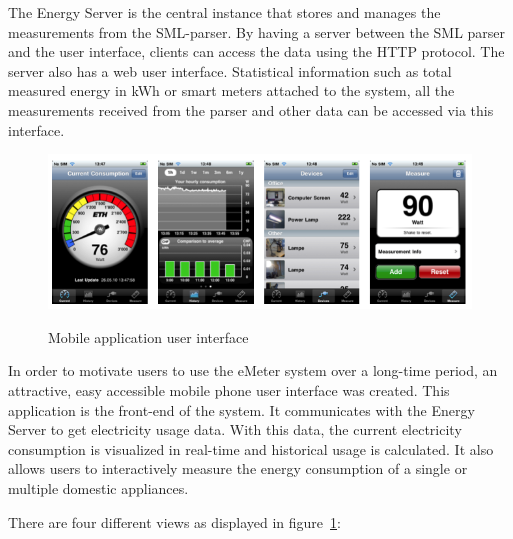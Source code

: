 The Energy Server is the central instance that stores and manages the measurements from the SML-parser. By having a server between the SML parser and the user interface, clients can access the data using the HTTP protocol. The server also has a web user interface. Statistical information such as total measured energy in kWh or smart meters attached to the system, all the measurements received from the parser and other data can be accessed via this interface. 

\begin{center}
\begin{figure}
 \includegraphics[width=16cm]{Images/iphone_screens.png}
 \label{iphone_screens}
 \caption{Mobile application user interface}
\end{figure}
\end{center}
In order to motivate users to use the eMeter system over a long-time period, an attractive, easy accessible mobile phone user interface was created. This application is the front-end of the system. It communicates with the Energy Server to get electricity usage data.
With this data, the current electricity consumption is visualized in real-time and historical usage is calculated. It also allows users to interactively measure the energy consumption of a single or multiple domestic appliances. 

There are four different views as displayed in figure~\ref{iphone_screens}:

